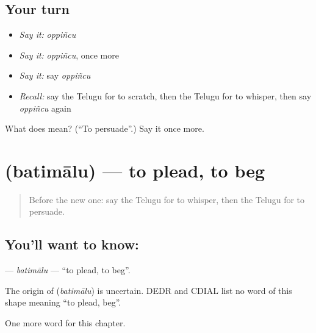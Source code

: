 \subsection*{Your turn}
\begin{itemize}
\raggedright
  \item \emph{Say it:} \emph{oppiñcu}
  \item \emph{Say it:} \emph{oppiñcu}, once more
  \item \emph{Say it:} say \emph{oppiñcu}
  \item \emph{Recall:} say the Telugu for to scratch, then the Telugu for to whisper, then say \emph{oppiñcu} again
\end{itemize}

\begin{tcolorbox}[breakable,colback=teal!4,colframe=teal!35!black,title={Before you move on}]
What does  mean? (\textquotedblleft{}To persuade\textquotedblright{}.) Say it once more.
\end{tcolorbox}
\section[\texorpdfstring{\te{బతిమాలు} (batimālu)}{బతిమాలు (batimālu)}]{ (batimālu) — to plead, to beg}

\label{lesson:TE-C247-batimalu}



\begin{quote}
Before the new one: say the Telugu for to whisper, then the Telugu for to persuade.
\end{quote}

\subsection*{You'll want to know: }
\textbf{} — \emph{batimālu} — \textquotedblleft{}to plead, to beg\textquotedblright{}.

\begin{cousinweb}
The origin of \textbf{} (\emph{batimālu}) is uncertain. DEDR and CDIAL list no word of this shape meaning \textquotedblleft{}to plead, beg\textquotedblright{}.
\end{cousinweb}

\begin{grammarlens}[title={What you've built}]
One more word for this chapter.
\end{grammarlens}

